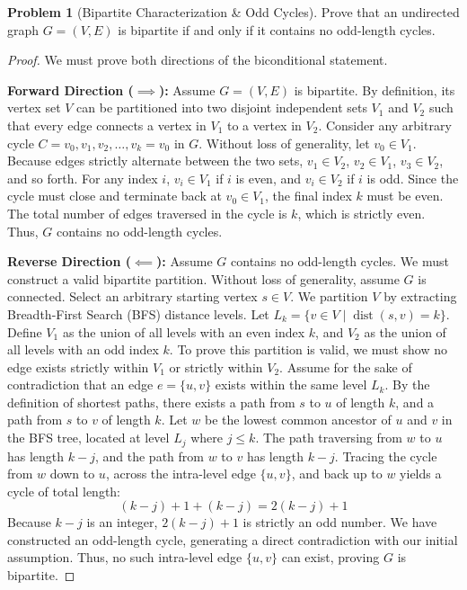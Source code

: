 \documentclass[11pt, a4paper]{article}
\theoremstyle{definition}
\newtheorem{problem}{Problem}
\theoremstyle{plain}
\begin{document}
\vspace{0.5cm}

\begin{problem}[Bipartite Characterization \& Odd Cycles]
Prove that an undirected graph $G = (V, E)$ is bipartite if and only if it contains no odd-length cycles.
\end{problem}

\begin{proof}
We must prove both directions of the biconditional statement.

\textbf{Forward Direction ($\implies$):} Assume $G = (V, E)$ is bipartite. By definition, its vertex set $V$ can be partitioned into two disjoint independent sets $V_1$ and $V_2$ such that every edge connects a vertex in $V_1$ to a vertex in $V_2$.
Consider any arbitrary cycle $C = v_0, v_1, v_2, \dots, v_k = v_0$ in $G$.
Without loss of generality, let $v_0 \in V_1$. Because edges strictly alternate between the two sets, $v_1 \in V_2$, $v_2 \in V_1$, $v_3 \in V_2$, and so forth.
For any index $i$, $v_i \in V_1$ if $i$ is even, and $v_i \in V_2$ if $i$ is odd.
Since the cycle must close and terminate back at $v_0 \in V_1$, the final index $k$ must be even. The total number of edges traversed in the cycle is $k$, which is strictly even. Thus, $G$ contains no odd-length cycles.

\textbf{Reverse Direction ($\impliedby$):} Assume $G$ contains no odd-length cycles. We must construct a valid bipartite partition. Without loss of generality, assume $G$ is connected.
Select an arbitrary starting vertex $s \in V$. We partition $V$ by extracting Breadth-First Search (BFS) distance levels. Let $L_k = \{v \in V \mid \operatorname{dist}(s, v) = k\}$.
Define $V_1$ as the union of all levels with an even index $k$, and $V_2$ as the union of all levels with an odd index $k$.
To prove this partition is valid, we must show no edge exists strictly within $V_1$ or strictly within $V_2$. Assume for the sake of contradiction that an edge $e = \{u, v\}$ exists within the same level $L_k$.
By the definition of shortest paths, there exists a path from $s$ to $u$ of length $k$, and a path from $s$ to $v$ of length $k$. Let $w$ be the lowest common ancestor of $u$ and $v$ in the BFS tree, located at level $L_j$ where $j \le k$.
The path traversing from $w$ to $u$ has length $k - j$, and the path from $w$ to $v$ has length $k - j$.
Tracing the cycle from $w$ down to $u$, across the intra-level edge $\{u, v\}$, and back up to $w$ yields a cycle of total length:
\[
(k - j) + 1 + (k - j) = 2(k - j) + 1
\]
Because $k - j$ is an integer, $2(k - j) + 1$ is strictly an odd number. We have constructed an odd-length cycle, generating a direct contradiction with our initial assumption. Thus, no such intra-level edge $\{u, v\}$ can exist, proving $G$ is bipartite.
\end{proof}
\end{document}
